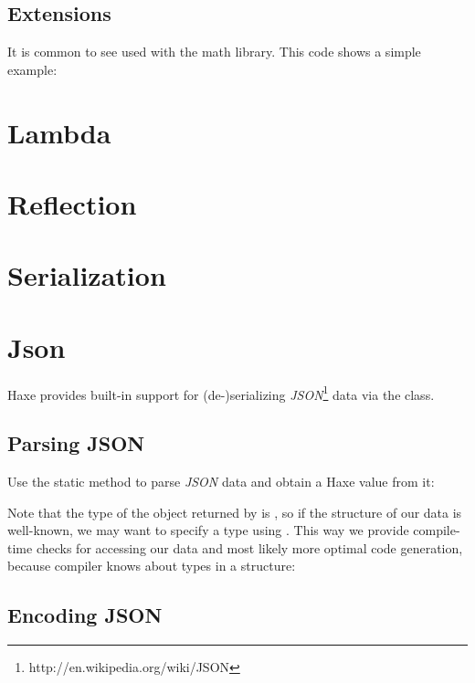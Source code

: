 \subsection{Extensions}
\label{std-math-extensions}
It is common to see  used with the math library.  This code shows a simple example:  


\section{Lambda}
\label{std-Lambda}

\section{Reflection}
\label{std-reflection}

\section{Serialization}
\label{std-serialization}

\section{Json}
\label{std-Json}

Haxe provides built-in support for (de-)serializing \emph{JSON}\footnote{http://en.wikipedia.org/wiki/JSON} data via the  class.

\subsection{Parsing JSON}
\label{std-Json-parsing}

Use the  static method to parse \emph{JSON} data and obtain a Haxe value from it:

Note that the type of the object returned by  is , so if the structure of our data is well-known, we may want to specify a type using . This way we provide compile-time checks for accessing our data and most likely more optimal code generation, because compiler knows about types in a structure:

\subsection{Encoding JSON}
\label{std-Json-encoding}

